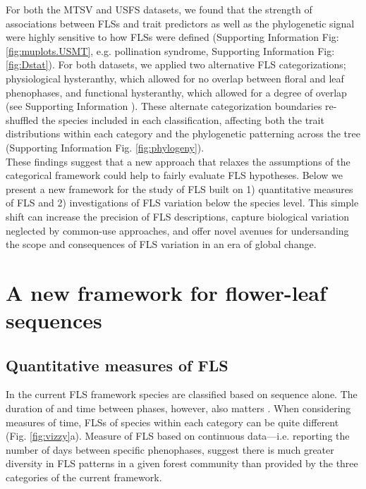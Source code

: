 \documentclass[11pt]{article}
\begin{document}
\noindent For both the MTSV and USFS datasets, we found that the strength of associations between FLSs and trait predictors as well as the phylogenetic signal were highly sensitive to how FLSs were defined (Supporting Information Fig: \ref{fig:muplots.USMT}, e.g. pollination syndrome, Supporting Information Fig: \ref{fig:Dstat}). For both datasets, we applied two alternative FLS categorizations; physiological hysteranthy, which allowed for no overlap between floral and leaf phenophases, and functional hysteranthy, which allowed for a degree of overlap (see Supporting Information ). These alternate categorization boundaries re-shuffled the species included in each classification, affecting both the trait distributions within each category and the phylogenetic patterning across the tree (Supporting Information Fig. \ref{fig:phylogeny}).\\ 
 
\noindent These findings suggest that a new approach that relaxes the assumptions of the categorical framework could help to fairly evaluate FLS hypotheses. Below we present a new framework for the study of FLS built on 1) quantitative measures of FLS and 2) investigations of FLS variation below the species level. This simple shift can increase the precision of FLS descriptions, capture biological variation neglected by common-use approaches, and offer novel avenues for undersanding the scope and consequences of FLS variation in an era of global change.

 
\section*{A new framework for flower-leaf sequences} 

\subsection*{Quantitative measures of FLS}

\noindent In the current FLS framework species are classified based on sequence alone. The duration of and time between phases, however, also matters \citep{Inouye2019}. When considering measures of time, FLSs of species within each category can be quite different (Fig. \ref{fig:vizzy}a). Measure of FLS based on continuous data---i.e. reporting the number of days between specific phenophases, suggest there is much greater diversity in FLS patterns in a given forest community than provided by the three categories of the current framework.\\ 
\end{document}
